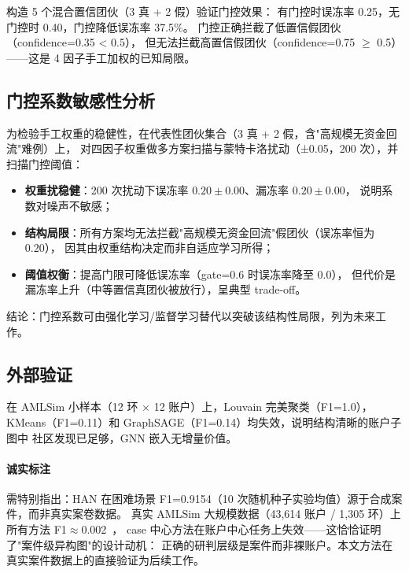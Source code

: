 \documentclass[12pt,a4paper]{ctexart}
\begin{document}
构造 5 个混合置信团伙（3 真 + 2 假）验证门控效果：
有门控时误冻率 0.25，无门控时 0.40，门控降低误冻率 37.5\%。
门控正确拦截了低置信假团伙（confidence=0.35 < 0.5），
但无法拦截高置信假团伙（confidence=0.75 $\ge$ 0.5）——这是 4 因子手工加权的已知局限。

\subsection{门控系数敏感性分析}

为检验手工权重的稳健性，在代表性团伙集合（3 真 + 2 假，含"高规模无资金回流"难例）上，
对四因子权重做多方案扫描与蒙特卡洛扰动（±0.05，200 次），并扫描门控阈值：
\begin{itemize}
  \item \textbf{权重扰稳健}：200 次扰动下误冻率 $0.20\pm0.00$、漏冻率 $0.20\pm0.00$，
    说明系数对噪声不敏感；
  \item \textbf{结构局限}：所有方案均无法拦截"高规模无资金回流"假团伙（误冻率恒为 0.20），
    因其由权重结构决定而非自适应学习所得；
  \item \textbf{阈值权衡}：提高门限可降低误冻率（gate=0.6 时误冻率降至 0.0），
    但代价是漏冻率上升（中等置信真团伙被放行），呈典型 trade-off。
\end{itemize}
结论：门控系数可由强化学习/监督学习替代以突破该结构性局限，列为未来工作。

\subsection{外部验证}
\label{sec:external}

在 AMLSim 小样本（12 环 $\times$ 12 账户）上，Louvain 完美聚类（F1=1.0），
KMeans（F1=0.11）和 GraphSAGE（F1=0.14）均失效，说明结构清晰的账户子图中
社区发现已足够，GNN 嵌入无增量价值。

\paragraph{诚实标注} 需特别指出：HAN 在困难场景 F1=0.9154（10 次随机种子实验均值）源于合成案件，而非真实案卷数据。
真实 AMLSim 大规模数据（43,614 账户 / 1,305 环）上所有方法 F1$\approx$0.002~\cite{weber2018amlfirstlook}，
case 中心方法在账户中心任务上失效——这恰恰证明了"案件级异构图"的设计动机：
正确的研判层级是案件而非裸账户。本文方法在真实案件数据上的直接验证为后续工作。
\end{document}
